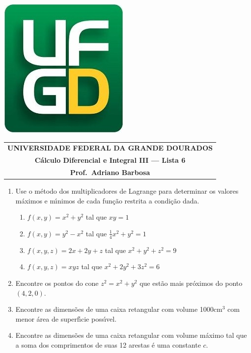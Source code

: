 \documentclass[a4paper,5pt]{amsbook}
\newcommand{\ds}{\displaystyle}
\begin{document}
\thispagestyle{empty}
\pagestyle{empty}
\begin{minipage}[h]{0.14\textwidth}
	\includegraphics[scale=0.24]{../../ufgd.png}
\end{minipage}
\begin{minipage}[h]{\textwidth}
\begin{tabular}{c}
{{\bf UNIVERSIDADE FEDERAL DA GRANDE DOURADOS}}\\
{{\bf C\'alculo Diferencial e Integral III --- Lista 6}}\\
{{\bf Prof.\ Adriano Barbosa}}\\
\end{tabular}
\vspace{-0.45cm}
%
\end{minipage}


\vspace{1cm}
\begin{enumerate}
    \setlength\itemsep{0.5cm}
    \item Use o m\'etodo dos multiplicadores de Lagrange para determinar os
    valores m\'aximos e m\'{\i}nimos de cada fun\c{c}\~ao restrita a condi\c{c}\~ao dada.
        \begin{enumerate}
            \setlength\itemsep{0.5cm}
            \item $f(x,y) = x^2+y^2$ tal que $xy=1$
            \item $f(x,y) = y^2-x^2$ tal que $\ds\frac{1}{4}x^2+y^2=1$
            \item $f(x,y,z) = 2x+2y+z$ tal que $x^2+y^2+z^2=9$
            \item $f(x,y,z) = xyz$ tal que $x^2+2y^2+3z^2=6$
        \end{enumerate}

    \item Encontre os pontos do cone $z^2=x^2+y^2$ que est\~ao mais pr\'oximos do
    ponto $(4,2,0)$.

    \item Encontre as dimens\~oes de uma caixa retangular com volume 1000cm$^3$
    com menor \'area de superf\'{\i}cie poss\'{\i}vel.

    \item Encontre as dimens\~oes de uma caixa retangular com volume m\'aximo tal
    que a soma dos comprimentos de suas 12 arestas \'e uma constante $c$.
\end{enumerate}
\end{document}
